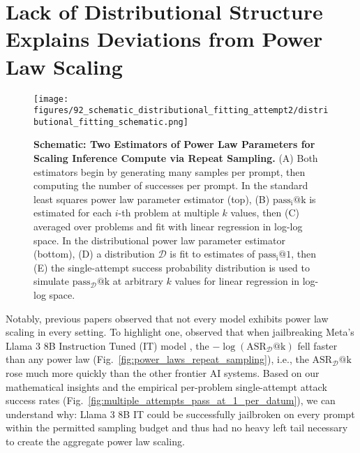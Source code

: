 \section{Lack of Distributional Structure Explains Deviations from Power Law Scaling}
\label{sec:no_dist_structure_no_power_law}


\begin{figure*}[t!]
    \centering
    \texttt{[image: figures/92\_schematic\_distributional\_fitting\_attempt2/distributional\_fitting\_schematic.png]}
    \caption{\textbf{Schematic: Two Estimators of Power Law Parameters for Scaling Inference Compute via Repeat Sampling.} (A) Both estimators begin by generating many samples per prompt, then computing the number of successes per prompt. In the standard least squares power law parameter estimator (top), (B) $\operatorname{pass_i@k}$ is estimated for each $i$-th problem at multiple $k$ values, then (C) averaged over problems and fit with linear regression in log-log space.
    In the distributional power law parameter estimator (bottom), (D) a distribution $\mathcal{D}$ is fit to estimates of $\operatorname{pass_i@1}$, then (E) the single-attempt success probability distribution is used to simulate $\operatorname{pass_{\mathcal{D}}@k}$ at arbitrary $k$ values for linear regression in log-log space.}
    \label{fig:schematic2}
\end{figure*}

Notably, previous papers observed that not every model exhibits power law scaling in every setting. To highlight one, \citet{hughes2024bestofnjailbreaking} observed that when jailbreaking Meta's Llama 3 8B Instruction Tuned (IT) model \cite{grattafiori2024llama3herdmodels}, the $-\log (\operatorname{ASR_{\mathcal{D}}@k})$ fell faster than any power law (Fig.~\ref{fig:power_laws_repeat_sampling}), i.e., the $\operatorname{ASR_{\mathcal{D}}@k}$ rose much more quickly than the other frontier AI systems. Based on our mathematical insights and the empirical per-problem single-attempt attack success rates (Fig.~\ref{fig:multiple_attempts_pass_at_1_per_datum}), we can understand why: Llama 3 8B IT could be successfully jailbroken on every prompt within the permitted sampling budget and thus had no heavy left tail necessary to create the aggregate power law scaling.


